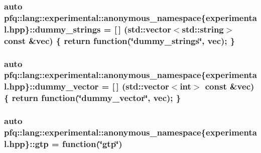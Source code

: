 \subsubsection[{\texorpdfstring{dummy\+\_\+strings}{dummy_strings}}]{\setlength{\rightskip}{0pt plus 5cm}auto pfq\+::lang\+::experimental\+::anonymous\+\_\+namespace\{experimental.\+hpp\}\+::dummy\+\_\+strings = \mbox{[}$\,$\mbox{]} (std\+::vector$<$std\+::string$>$ const \&vec) \{ return {\bf function}(\char`\"{}dummy\+\_\+strings\char`\"{}, vec); \}}\hypertarget{namespacepfq_1_1lang_1_1experimental_1_1anonymous__namespace_02experimental_8hpp_03_af6c041f2494f9dd06acb73d42524e3ad}{}\label{namespacepfq_1_1lang_1_1experimental_1_1anonymous__namespace_02experimental_8hpp_03_af6c041f2494f9dd06acb73d42524e3ad}
\subsubsection[{\texorpdfstring{dummy\+\_\+vector}{dummy_vector}}]{\setlength{\rightskip}{0pt plus 5cm}auto pfq\+::lang\+::experimental\+::anonymous\+\_\+namespace\{experimental.\+hpp\}\+::dummy\+\_\+vector = \mbox{[}$\,$\mbox{]} (std\+::vector$<$int$>$ const \&vec) \{ return {\bf function}(\char`\"{}dummy\+\_\+vector\char`\"{}, vec); \}}\hypertarget{namespacepfq_1_1lang_1_1experimental_1_1anonymous__namespace_02experimental_8hpp_03_a8ee61246090fb5d74e96dbb7f19b7008}{}\label{namespacepfq_1_1lang_1_1experimental_1_1anonymous__namespace_02experimental_8hpp_03_a8ee61246090fb5d74e96dbb7f19b7008}
\subsubsection[{\texorpdfstring{gtp}{gtp}}]{\setlength{\rightskip}{0pt plus 5cm}auto pfq\+::lang\+::experimental\+::anonymous\+\_\+namespace\{experimental.\+hpp\}\+::gtp = {\bf function}(\char`\"{}gtp\char`\"{})}\hypertarget{namespacepfq_1_1lang_1_1experimental_1_1anonymous__namespace_02experimental_8hpp_03_abd26824e1b0e6a31ddbba793b727ef8f}{}\label{namespacepfq_1_1lang_1_1experimental_1_1anonymous__namespace_02experimental_8hpp_03_abd26824e1b0e6a31ddbba793b727ef8f}


